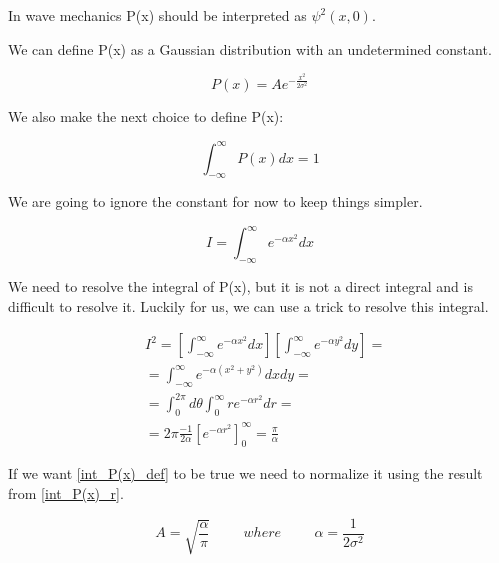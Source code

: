In wave mechanics P(x) should be interpreted as $\psi^2(x,0)$.


We can define P(x) as a Gaussian distribution with an undetermined constant.

\begin{equation}
\label{P(x)_def}
    P(x) = A e^{-\frac{x^2}{2 \sigma^2}}
\end{equation}

We also make the next choice to define P(x):

\begin{equation}
\label{int_P(x)_def}
    \int_{-\infty}^{\infty}P(x) dx = 1
\end{equation}

We are going to ignore the constant for now to keep things simpler.

\begin{equation}
\label{int_P(x)_alpha}
    I = \int_{-\infty}^{\infty}e^{-\alpha x^2} dx
\end{equation}


We need to resolve the integral of P(x), but it is not a direct integral and is difficult to resolve it. Luckily for us, we can use a trick to resolve this integral.

\begin{equation}
\label{int_P(x)_r}
\begin{split}
    &I^2 = \left[\int_{-\infty}^{\infty}e^{-\alpha x^2} dx\right] \left[\int_{-\infty}^{\infty}e^{-\alpha y^2} dy\right] =\\
    & =  \int_{-\infty}^{\infty}e^{-\alpha(x^2+y^2)}dxdy = \\
    & =  \int_{0}^{2\pi}d\theta\int_{0}^{\infty}re^{-\alpha r^2}dr = \\
    & = 2\pi \frac{-1}{2\alpha} \left[ e^{-\alpha r^2} \right]_{0}^{\infty} = \frac{\pi}{\alpha}
\end{split}
\end{equation}


If we want \ref{int_P(x)_def} to be true we need to normalize it using the result from \ref{int_P(x)_r}.

\begin{equation}
A = \sqrt{\frac{\alpha}{\pi}} \hspace{1cm} where \hspace{1cm} \alpha = \frac{1}{2\sigma^2}
\end{equation}

